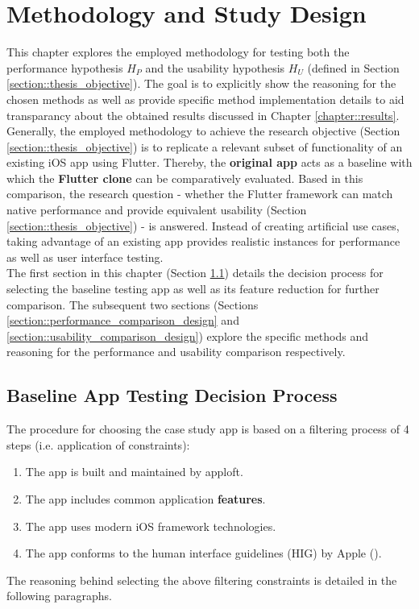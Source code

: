 \chapter{Methodology and Study Design} \label{chapter::study_design}
This chapter explores the employed methodology for testing both the performance hypothesis $H_P$ and the usability hypothesis $H_U$ (defined in Section \ref{section::thesis_objective}). 
The goal is to explicitly show the reasoning for the chosen methods as well as provide specific method implementation details to aid transparancy about the obtained results discussed in Chapter \ref{chapter::results}.\\
Generally, the employed methodology to achieve the research objective (Section \ref{section::thesis_objective}) is to replicate a relevant subset of functionality of an existing iOS app using Flutter. Thereby, the \textbf{original app} acts as a baseline with which the \textbf{Flutter clone} 
can be comparatively evaluated. Based in this comparison, the research question - whether the Flutter framework can match native performance and provide equivalent usability (Section \ref{section::thesis_objective}) - is answered.
Instead of creating artificial use cases, taking advantage of an existing app provides realistic instances for performance as well as user interface testing.\\
The first section in this chapter (Section \ref{section::feature_selection}) details the decision process for selecting the baseline testing app as well as its feature reduction for further comparison. 
The subsequent two sections (Sections \ref{section::performance_comparison_design} and \ref{section::usability_comparison_design}) explore the specific methods and reasoning for the performance and 
usability comparison respectively.




\section{Baseline App Testing Decision Process} \label{section::feature_selection}
The procedure for choosing the case study app is based on a filtering process of 4 steps (i.e. application of constraints):
\begin{enumerate}
    \item The app is built and maintained by apploft. \label{item::constraint_one}
    \item The app includes common application \textbf{features}. \label{item::constraint_two}
    \item The app uses modern iOS framework technologies. \label{item::constraint_three}
    \item The app conforms to the human interface guidelines (HIG) by Apple (\cite{Apple2021a}). \label{item::constraint_four}
\end{enumerate}
The reasoning behind selecting the above filtering constraints is detailed in the following paragraphs.


